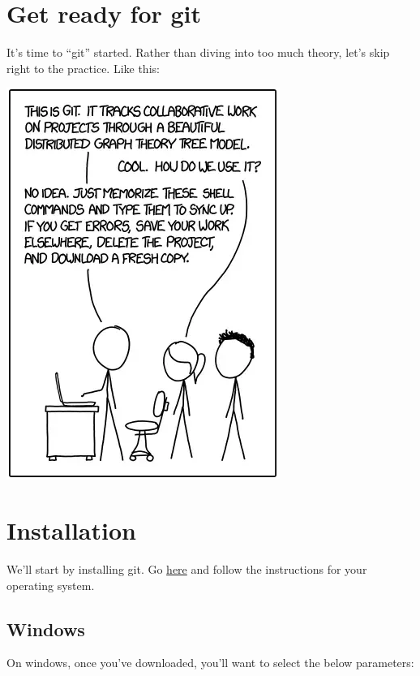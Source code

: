 \documentclass[
]{book}
\begin{document}
\hypertarget{get-ready-for-git}{%
\section*{Get ready for git}\label{get-ready-for-git}}

It's time to ``git'' started. Rather than diving into too much theory, let's skip right to the practice. Like this:

\includegraphics{img/git.png}

\hypertarget{installation}{%
\section*{Installation}\label{installation}}

We'll start by installing git. Go \href{https://git-scm.com/book/en/v2/Getting-Started-Installing-Git}{here} and follow the instructions for your operating system.

\hypertarget{windows}{%
\subsection*{Windows}\label{windows}}

On windows, once you've downloaded, you'll want to select the below parameters:
\end{document}
